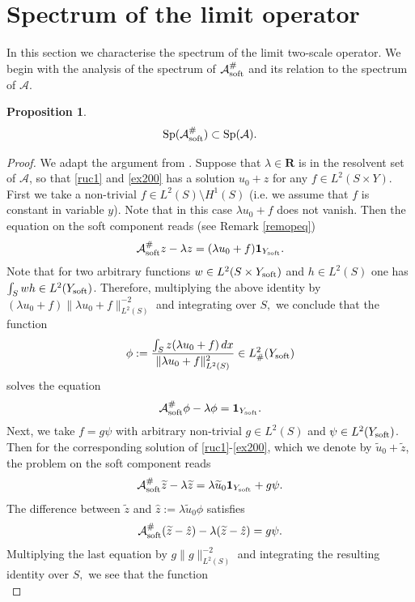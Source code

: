 \documentclass[11pt]{article}
\newcommand\soft{{\rm soft}}
\newcommand{\R}{\mathbf{R}}
\def\AA{\mathcal{A}}
\def\l{\lambda}
\DeclareMathOperator{\Sp}{Sp}
\newtheorem{proposition}[theorem]{Proposition}
\theoremstyle{remark}
\begin{document}


\section{Spectrum of the limit operator}\label{s5}
In this section we characterise the spectrum of the limit two-scale operator.
We begin with the analysis of the spectrum of $\AA_\soft^\#$ and its relation to the spectrum of $\AA$.
%
\begin{proposition} \label{propsri1}
	$$\Sp  (\AA_\soft^\# ) \subset  	\Sp  (\AA).$$
\end{proposition} 	
\begin{proof}
	We adapt the argument from \cite[Proposition 4.1]{CCV23}.
	Suppose that $\l\in \R$ is in the resolvent set of $\AA$, so that \eqref{ruc1} and \eqref{ex200}   has a solution $u_0+z$  for any $f\in L^2(S \times Y)$.  First we take a non-trivial $f \in L^2(S)\setminus H^1(S)$ (i.e. we assume that $f$ is constant in variable $y$). Note that in this case $ \lambda u_0 +f$ does not vanish. Then the equation on the soft component reads (see Remark \ref{remopeq})
	$$ \AA_\soft^\#  z-\lambda z=(\lambda u_0+ f)\mathbf{1}_{Y_\soft }.$$
	Note  that for two arbitrary functions $w\in L^2(S\times Y_\soft )$ and $h\in L^2(S)$ one has $\int_S w h \in L^2(Y_\soft )$. Therefore, multiplying the above identity by ${(\l u_0 +f)}\|\l u_0 +f\|^{-2}_{L^2(S)}$  and integrating over $S,$ we conclude that the function
	\begin{equation*}%
		\phi:= \frac{\int_S z {(\l u_0 +f)}\,dx}{\|\l u_0 +f\|^2_{L^2(S)}} \in L^2_\#(Y_\soft  )
	\end{equation*}
	solves the equation
	$$ \AA_\soft^\#  \phi-\lambda \phi={\mathbf 1}_{Y_\soft }.$$
	Next, we take $f = g \psi$ with arbitrary non-trivial $g\in L^2(S)$ and $\psi\in L^2(Y_\soft )$. Then for the corresponding solution of \eqref{ruc1}-\eqref{ex200}, which we denote by $\widetilde u_0 + \widetilde z$, the problem on the soft component reads
	$$ \AA_\soft^\#  \widetilde z-\lambda \widetilde z=\lambda \widetilde u_0 {\mathbf 1}_{Y_\soft }+g\psi. $$
	The difference between $\widetilde z$ and $\hat{z}:=\lambda\widetilde u_0\phi$
	satisfies
	$$ \AA_\soft^\#  (\widetilde z-\hat{z})-\lambda (\widetilde z-\hat{z})=g\psi.$$
	Multiplying the last equation by ${g}\|g\|^{-2}_{L^2(S)}$ and integrating the resulting identity over $S,$ we see that	the function
	\begin{equation*}

\end{equation*}
\end{proof}
\end{document}
